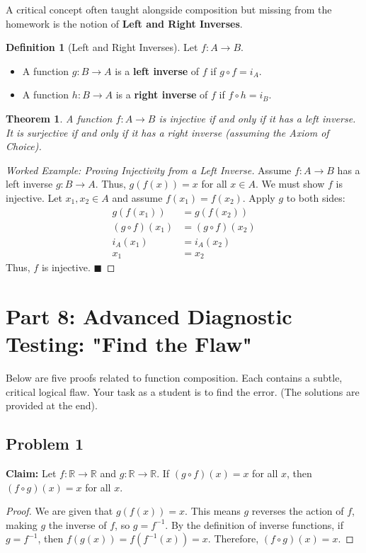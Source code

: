 \documentclass[11pt, a4paper]{article}
\newtheorem{theorem}{Theorem}[section]
\theoremstyle{definition}
\newtheorem{definition}{Definition}[section]
\theoremstyle{remark}
\newcommand{\R}{\mathbb{R}}
\begin{document}
A critical concept often taught alongside composition but missing from the homework is the notion of \textbf{Left and Right Inverses}.

\begin{definition}[Left and Right Inverses]
Let $f: A \to B$. 
\begin{itemize}
    \item A function $g: B \to A$ is a \textbf{left inverse} of $f$ if $g \circ f = i_A$.
    \item A function $h: B \to A$ is a \textbf{right inverse} of $f$ if $f \circ h = i_B$.
\end{itemize}
\end{definition}

\begin{theorem}
A function $f: A \to B$ is injective if and only if it has a left inverse. It is surjective if and only if it has a right inverse (assuming the Axiom of Choice).
\end{theorem}

\begin{proof}[Worked Example: Proving Injectivity from a Left Inverse]
Assume $f: A \to B$ has a left inverse $g: B \to A$. Thus, $g(f(x)) = x$ for all $x \in A$. We must show $f$ is injective.
Let $x_1, x_2 \in A$ and assume $f(x_1) = f(x_2)$.
Apply $g$ to both sides:
\begin{align*}
    g(f(x_1)) &= g(f(x_2)) \\
    (g \circ f)(x_1) &= (g \circ f)(x_2) \\
    i_A(x_1) &= i_A(x_2) \\
    x_1 &= x_2
\end{align*}
Thus, $f$ is injective. $\blacksquare$
\end{proof}

\section{Part 8: Advanced Diagnostic Testing: "Find the Flaw"}

Below are five proofs related to function composition. Each contains a subtle, critical logical flaw. Your task as a student is to find the error. (The solutions are provided at the end).

\subsection*{Problem 1}
\textbf{Claim:} Let $f: \R \to \R$ and $g: \R \to \R$. If $(g \circ f)(x) = x$ for all $x$, then $(f \circ g)(x) = x$ for all $x$.
\begin{proof}
We are given that $g(f(x)) = x$. This means $g$ reverses the action of $f$, making $g$ the inverse of $f$, so $g = f^{-1}$. By the definition of inverse functions, if $g = f^{-1}$, then $f(g(x)) = f(f^{-1}(x)) = x$. Therefore, $(f \circ g)(x) = x$.
\end{proof}
\end{document}
